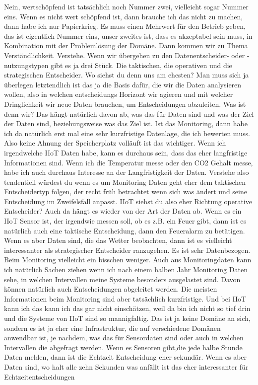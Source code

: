 \PA	 Nein, wertschöpfend ist tatsächlich noch Nummer zwei, vielleicht sogar Nummer eins. Wenn es nicht wert schöpfend ist, dann brauche ich das nicht zu machen, dann habe ich nur Papierkrieg. Es muss einen Mehrwert für den Betrieb geben, das ist eigentlich Nummer eins, unser zweites ist, dass es akzeptabel sein muss, in Kombination mit der Problemlösung der Domäne. Dann kommen wir zu Thema Verständlichkeit.
\LF	 Verstehe. Wenn wir übergehen zu den Datenentscheider- oder -nutzungstypen gibt es ja drei Stück.  Die taktischen, die operativen und die strategischen Entscheider. Wo siehst du denn uns am ehesten? Man muss sich ja überlegen letztendlich ist das ja die Basis dafür, die wir die Daten analysieren wollen, also in welchen entscheidungs Horizont wir agieren und mit welcher Dringlichkeit wir neue Daten brauchen, um Entscheidungen abzuleiten.
\PA	 Was ist denn wir? Das hängt natürlich davon ab, was das für Daten sind und was der Ziel der Daten sind, beziehungsweise was das Ziel ist. Ist das Monitoring, dann habe ich da natürlich erst mal eine sehr kurzfristige Datenlage, die ich bewerten muss. Also keine Ahnung der Speicherplatz volläuft ist das wichtiger. Wenn ich irgendwelche \ac{IIoT} Daten habe, kann es durchaus sein, dass das eher langfristige Informationen sind. Wenn ich die Temperatur messe oder den CO2 Gehalt messe, habe ich auch durchaus Interesse an der Langfristigkeit der Daten.
\LF	 Verstehe also tendentiell würdest du wenn es um Monitoring Daten geht eher dem taktischen Entscheidertyp folgen, der recht früh betrachtet wenn sich was ändert und seine Entscheidung im Zweifelsfall anpasst. \ac{IIoT} siehst du also eher Richtung operative Entscheider?
\PA	Auch da hängt es wieder von der Art der Daten ab. Wenn es ein IIoT Sensor ist, der irgendwie messen soll, ob es z.B. ein Feuer gibt, dann ist es natürlich auch eine taktische Entscheidung, dann den Feueralarm zu betätigen. Wenn es aber Daten sind, die das Wetter beobachten, dann ist es vielleicht interessanter als strategischer Entscheider ranzugehen. Es ist sehr Datenbezogen. Beim Monitoring vielleicht ein bisschen weniger. Auch aus Monitoringdaten kann ich natürlich Sachen ziehen wenn ich nach einem halben Jahr Monitoring Daten sehe, in welchen Intervallen meine Systeme besonders ausgelastet sind.  Davon können natürlich auch Entscheidungen abgeleitet werden. Die meisten Informationen beim Monitoring sind aber tatsächlich kurzfristige. Und bei \ac{IIoT} kann ich das kann ich das gar nicht einschätzen, weil da bin ich nicht so tief drin und die Systeme von \ac{IIoT} sind so mannigfaltig. Das ist ja keine Domäne an sich, sondern es ist ja eher eine Infrastruktur, die auf verschiedene Domänen anwendbar ist, je nachdem, was das für Sensordaten sind oder auch in welchen Intervallen die abgefragt werden. Wenn es Sensoren gibt,die jede halbe Stunde Daten melden, dann ist die Echtzeit Entscheidung eher sekundär. Wenn es aber Daten sind, wo halt alle zehn Sekunden was anfällt ist das eher interessanter für Echtzeitentscheidungen
